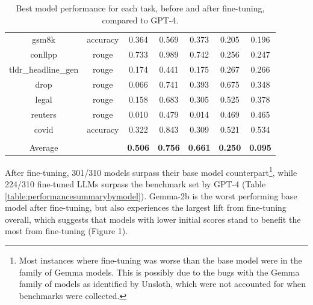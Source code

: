 \begin{table}[ht]
{\begin{tabular}{ccccccc}
gsm8k                & accuracy             & 0.364                & 0.569                & 0.373                & 0.205                 & 0.196                    \\
conllpp              & rouge                & 0.733                & 0.989                & 0.742                & 0.256                 & 0.247                    \\
tldr\_headline\_gen  & rouge                & 0.174                & 0.441                & 0.175                & 0.267                 & 0.266                    \\
drop                 & rouge                & 0.066                & 0.741                & 0.393                & 0.675                 & 0.348                    \\
legal                & rouge                & 0.158                & 0.683                & 0.305                & 0.525                 & 0.378                    \\
reuters              & rouge                & 0.010                & 0.479                & 0.014                & 0.469                 & 0.465                    \\
covid                & accuracy             & 0.322                & 0.843                & 0.309                & 0.521                 & 0.534                    \\
\multicolumn{1}{l}{} & \multicolumn{1}{l}{} & \multicolumn{1}{l}{} & \multicolumn{1}{l}{} & \multicolumn{1}{l}{} & \multicolumn{1}{l}{}  & \multicolumn{1}{l}{}     \\
\midrule
Average              & \multicolumn{1}{l}{} & \textbf{0.506}       & \textbf{0.756}       & \textbf{0.661}       & \textbf{0.250}        & \textbf{0.095}          
\end{tabular}
}

\caption{Best model performance for each task, before and after fine-tuning, compared to GPT-4.}
\label{table:performancesummarybytask}

\end{table}

After fine-tuning, 301/310 models surpass their base model counterpart\footnote{Most instances where fine-tuning was worse than the base model were in the family of Gemma models. This is possibly due to the bugs with the Gemma family of models as identified by Unsloth\cite{65unslothUnslothFixing}, which were not accounted for when benchmarks were collected.}, while 224/310 fine-tuned LLMs surpass the benchmark set by GPT-4 (Table \ref{table:performancesummarybymodel}). Gemma-2b is the worst performing base model after fine-tuning, but also experiences the largest lift from fine-tuning overall, which suggests that models with lower initial scores stand to benefit the most from fine-tuning (Figure 1).

